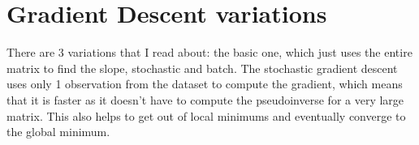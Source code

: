 \documentclass[12pt,a4paper]{article}
\begin{document}
\section{Gradient Descent variations} 
There are 3 variations that I read about: the basic one, which just uses the entire matrix to find the slope, stochastic and batch. The stochastic gradient descent uses only 1 observation from the dataset to compute the gradient, which means that it is faster as it doesn't have to compute the pseudoinverse for a very large matrix. This also helps to get out of local minimums and eventually converge to the global minimum.

\maketitle
\end{document}
